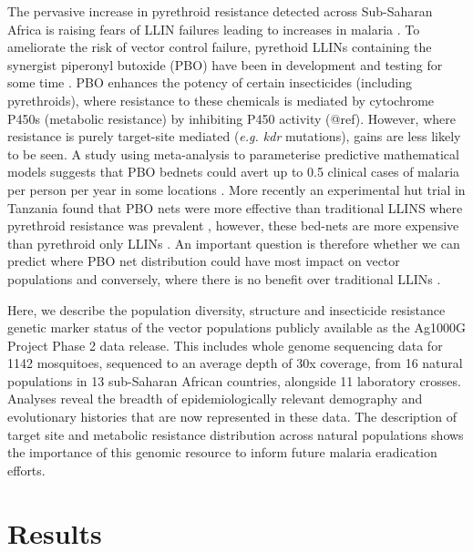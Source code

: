 \documentclass[a4paper,11pt,abstracton,hidelinks]{scrartcl}
\begin{document}
The pervasive increase in pyrethroid resistance detected across Sub-Saharan Africa is raising fears of LLIN failures leading to increases in malaria \cite{churcher2016, Hemingway2016}.
%
To ameliorate the risk of vector control failure, pyrethoid LLINs containing the synergist piperonyl butoxide (PBO) have been in development and testing for some time \cite{darriet2011, protopopoff2018}.
%
PBO enhances the potency of certain insecticides (including pyrethroids), where resistance to these chemicals is mediated by cytochrome P450s (metabolic resistance) by inhibiting P450 activity (@ref).
%
However, where resistance is purely target-site mediated (\textit{e.g. kdr} mutations), gains are less likely to be seen.
%
A study using  meta-analysis to parameterise predictive mathematical models suggests that PBO bednets could avert up to 0.5 clinical cases of malaria per person per year in some locations \cite{churcher2016}.
%
More recently an experimental hut trial in Tanzania found that PBO nets were more effective than traditional LLINS where pyrethroid resistance was prevalent \cite{protopopoff2018}, however, these bed-nets are more expensive than pyrethroid only LLINs \cite{churcher2016}.
%
An important question is therefore whether we can predict where PBO net distribution could have most impact on vector populations and conversely, where there is no benefit over traditional LLINs \cite{protopopoff2018, toe2018}.


Here, we describe the population diversity, structure and insecticide resistance genetic marker status of the vector populations publicly available as the Ag1000G Project Phase 2 data release.
%
This includes whole genome sequencing data for 1142 mosquitoes, sequenced to an average depth of 30x coverage, from 16 natural populations in 13 sub-Saharan African countries, alongside 11 laboratory crosses.
%
Analyses reveal the breadth of epidemiologically relevant demography and evolutionary histories that are now represented in these data.
%
The description of target site and metabolic resistance distribution across natural populations shows the importance of this genomic resource to inform future malaria eradication efforts.



\section*{Results}
\end{document}
